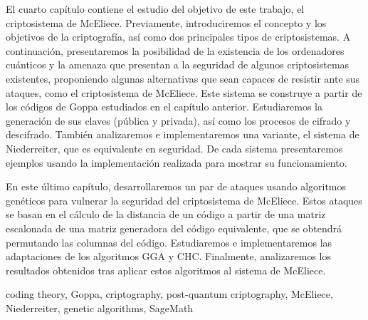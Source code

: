 
El cuarto capítulo contiene el estudio del objetivo de este trabajo, el criptosistema de McEliece. Previamente, introduciremos el concepto y los objetivos de la criptografía, así como dos principales tipos de criptosistemas. A continuación, presentaremos la posibilidad de la existencia de los ordenadores cuánticos y la amenaza que presentan a la seguridad de algunos criptosistemas existentes, proponiendo algunas alternativas que sean capaces de resistir ante sus ataques, como el criptosistema de McEliece. Este sistema se construye a partir de los códigos de Goppa estudiados en el capítulo anterior. Estudiaremos la generación de sus claves (pública y privada), así como los procesos de cifrado y descifrado. También analizaremos e implementaremos una variante, el sistema de Niederreiter, que es equivalente en seguridad. De cada sistema presentaremos ejemplos usando la implementación realizada para mostrar su funcionamiento.


En este último capítulo, desarrollaremos un par de ataques usando algoritmos genéticos para vulnerar la seguridad del criptosistema de McEliece. Estos ataques se basan en el cálculo de la distancia de un código a partir de una matriz escalonada de una matriz generadora del código equivalente, que se obtendrá permutando las columnas del código. Estudiaremos e implementaremos las adaptaciones de los algoritmos GGA y CHC. Finalmente, analizaremos los resultados obtenidos tras aplicar estos algoritmos al sistema de McEliece.

\small{ coding theory, \; Goppa, \; criptography, \; post-quantum criptography, \; McEliece, \; Niederreiter, \; genetic algorithms, \; SageMath}

